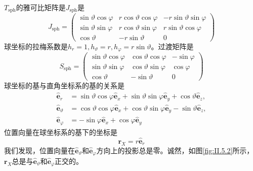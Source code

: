 \documentclass[../main.tex]{subfiles}
\begin{document}
\begin{example}[柱坐标系和球坐标系的基]
    $T_\mathrm{sph}$的雅可比矩阵是$J_\mathrm{sph}$是
    \[
        J_\mathrm{sph}=\left(\begin{array}{ccc}
                \sin\vartheta\cos\varphi & r\cos\vartheta\cos\varphi & -r\sin\vartheta\sin\varphi \\
                \sin\vartheta\sin\varphi & r\cos\vartheta\sin\varphi & r\sin\vartheta\cos\varphi  \\
                \cos\vartheta            & -r\sin\vartheta           & 0
            \end{array}\right)
    \]
    球坐标的拉梅系数是$h_r=1,h_\vartheta=r,h_\varphi=r\sin\vartheta$。过渡矩阵是
    \[
        S_\mathrm{sph}=\left(\begin{array}{ccc}
                \sin\vartheta\cos\varphi & \cos\vartheta\cos\varphi & -\sin\varphi \\
                \sin\vartheta\sin\varphi & \cos\vartheta\sin\varphi & \cos\varphi  \\
                \cos\vartheta            & -\sin\vartheta           & 0
            \end{array}\right)
    \]
    球坐标的基与直角坐标系的基的关系是
    \[
        \begin{aligned}
            \mathbf{\hat{e}}_r         & =\sin\vartheta\cos\varphi\mathbf{\hat{e}}_x+\sin\vartheta\sin\varphi\mathbf{\hat{e}}_y+\cos\vartheta\mathbf{\hat{e}}_z, \\
            \mathbf{\hat{e}}_\vartheta & =\cos\vartheta\cos\varphi\mathbf{\hat{e}}_x+\cos\vartheta\sin\varphi\mathbf{\hat{e}}_y-\sin\vartheta\mathbf{\hat{e}}_z, \\
            \mathbf{\hat{e}}_\varphi   & =-\sin\varphi\mathbf{\hat{e}}_x+\cos\varphi\mathbf{\hat{e}}_y
        \end{aligned}
    \]
    位置向量在球坐标系的基下的坐标是
    \[
        \mathbf{r}_X=r\mathbf{\hat{e}}_r
    \]
    我们发现，位置向量在$\mathbf{\hat{e}}_\vartheta$和$\mathbf{\hat{e}}_\varphi$方向上的投影总是零。诚然，如图\ref{fig:II.5.2}所示，$\mathbf{r}_X$总是与$\mathbf{\hat{e}}_\vartheta$和$\mathbf{\hat{e}}_\varphi$正交的。
\end{example}



\end{document}
